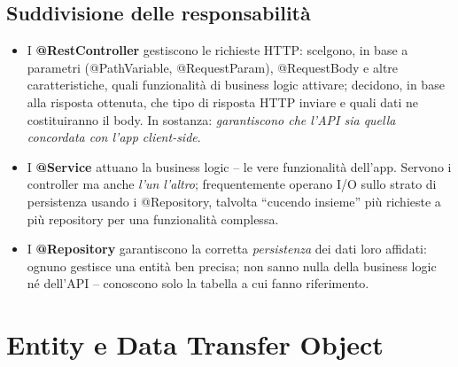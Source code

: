 \subsection{Suddivisione delle responsabilit\`a}
\begin{importante}
\begin{itemize}
  \item I \textbf{@RestController} gestiscono le richieste HTTP: scelgono, in base a
        parametri (@PathVariable, @RequestParam), @RequestBody e altre caratteristiche, quali
        funzionalit\`a di business logic attivare; decidono, in base alla risposta ottenuta,
        che tipo di risposta HTTP inviare e quali dati ne costituiranno il body. In sostanza:
        \emph{garantiscono che l'API sia quella concordata con l'app client-side}.
  \item I \textbf{@Service} attuano la business logic -- le vere funzionalit\`a dell'app.
        Servono i controller ma anche \emph{l'un l'altro}; frequentemente operano I/O sullo
        strato di persistenza usando i @Repository, talvolta ``cucendo insieme'' pi\`u
        richieste a pi\`u repository per una funzionalit\`a complessa.
  \item I \textbf{@Repository} garantiscono la corretta \emph{persistenza} dei dati loro
        affidati: ognuno gestisce una entit\`a ben precisa; non sanno nulla della business
        logic n\'e dell'API -- conoscono solo la tabella a cui fanno riferimento.
\end{itemize}
\end{importante}

\section{Entity e Data Transfer Object}

